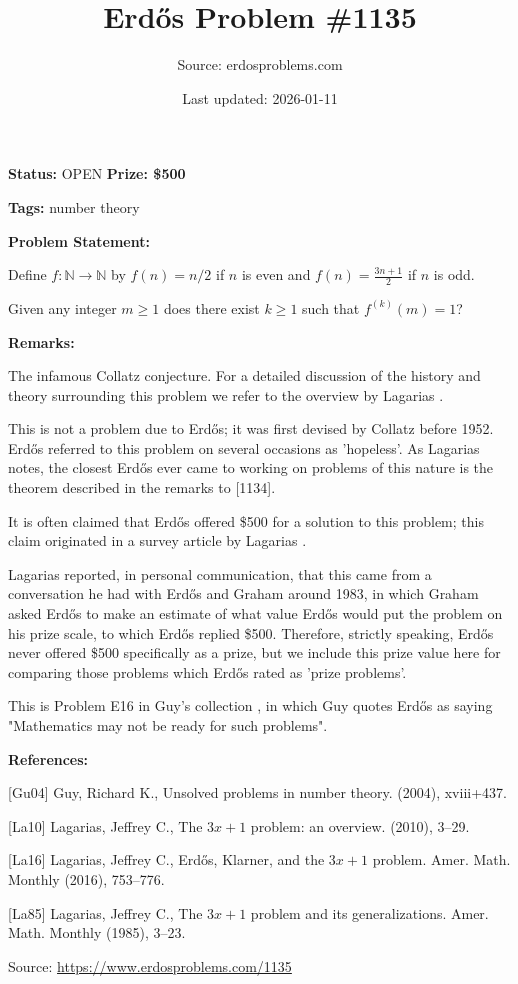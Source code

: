 \documentclass{article}
\title{Erd\H{o}s Problem \#1135}
\date{Last updated: 2026-01-11}
\author{Source: erdosproblems.com}
\begin{document}
\maketitle

\noindent\textbf{Status:} OPEN \quad \textbf{Prize: \$500}

\noindent\textbf{Tags:} number theory

\medskip
\noindent\textbf{Problem Statement:}

Define $f:\mathbb{N}\to \mathbb{N}$ by $f(n)=n/2$ if $n$ is even and $f(n)=\frac{3n+1}{2}$ if $n$ is odd.

Given any integer $m\geq 1$ does there exist $k\geq 1$ such that $f^{(k)}(m)=1$?

\bigskip
\noindent\textbf{Remarks:}

The infamous Collatz conjecture. For a detailed discussion of the history and theory surrounding this problem we refer to the overview by Lagarias \cite{La10}.

This is not a problem due to Erd\H{o}s; it was first devised by Collatz before 1952. Erd\H{o}s referred to this problem on several occasions as 'hopeless'. As Lagarias \cite{La16} notes, the closest Erd\H{o}s ever came to working on problems of this nature is the theorem described in the remarks to [1134]. 

It is often claimed that Erd\H{o}s offered \$500 for a solution to this problem; this claim originated in a survey article by Lagarias \cite{La85}.

Lagarias reported, in personal communication, that this came from a conversation he had with Erd\H{o}s and Graham around 1983, in which Graham asked Erd\H{o}s to make an estimate of what value Erd\H{o}s would put the problem on his prize scale, to which Erd\H{o}s replied \$500. Therefore, strictly speaking, Erd\H{o}s never offered \$500 specifically as a prize, but we include this prize value here for comparing those problems which Erd\H{o}s rated as 'prize problems'.

This is Problem E16 in Guy's collection \cite{Gu04}, in which Guy quotes Erd\H{o}s as saying "Mathematics may not be ready for such problems".

\bigskip
\noindent\textbf{References:}

[Gu04] Guy, Richard K., Unsolved problems in number theory. (2004), xviii+437.
 
 [La10] Lagarias, Jeffrey C., The {$3x+1$} problem: an overview. (2010), 3--29.
 
 [La16] Lagarias, Jeffrey C., Erd\H{o}s, {K}larner, and the {$3x+1$} problem. Amer. Math. Monthly (2016), 753--776.
 
 [La85] Lagarias, Jeffrey C., The {$3x+1$} problem and its generalizations. Amer. Math. Monthly (1985), 3--23.

\bigskip
\noindent\small{Source: \url{https://www.erdosproblems.com/1135}}
\end{document}
